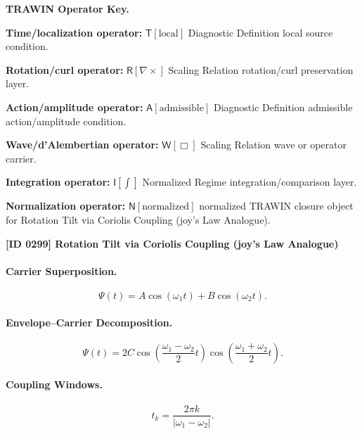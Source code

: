 \par\vspace{0.45\baselineskip}
\noindent\begin{minipage}[t]{\linewidth}
\begingroup
\small
\raggedright
\textbf{TRAWIN Operator Key.}\par
\noindent\textbf{Time/localization operator:} $\mathsf{T}\!\left[\mathrm{local}\right]$ Diagnostic Definition local source condition.\par
\noindent\textbf{Rotation/curl operator:} $\mathsf{R}\!\left[\nabla\times\right]$ Scaling Relation rotation/curl preservation layer.\par
\noindent\textbf{Action/amplitude operator:} $\mathsf{A}\!\left[\mathrm{admissible}\right]$ Diagnostic Definition admissible action/amplitude condition.\par
\noindent\textbf{Wave/d'Alembertian operator:} $\mathsf{W}\!\left[\Box\right]$ Scaling Relation wave or operator carrier.\par
\noindent\textbf{Integration operator:} $\mathsf{I}\!\left[\int\right]$ Normalized Regime integration/comparison layer.\par
\noindent\textbf{Normalization operator:} $\mathsf{N}\!\left[\mathrm{normalized}\right]$ normalized TRAWIN closure object for Rotation Tilt via Coriolis Coupling (joy's Law Analogue).\par
\endgroup
\end{minipage}

\clearpage
\noindent\textbf{[ID 0299] Rotation Tilt via Coriolis Coupling (joy's Law Analogue)}\par
\vspace{0.35em}
\paragraph{Carrier Superposition.}
\begin{equation}
\Psi(t)=A\cos(\omega_1t)+B\cos(\omega_2t).
\end{equation}

\paragraph{Envelope--Carrier Decomposition.}
\begin{equation}
\Psi(t)
=
2C
\cos\left(
\frac{\omega_1-\omega_2}{2}t
\right)
\cos\left(
\frac{\omega_1+\omega_2}{2}t
\right).
\end{equation}

\paragraph{Coupling Windows.}
\begin{equation}
t_k=
\frac{2\pi k}{|\omega_1-\omega_2|}.
\end{equation}

